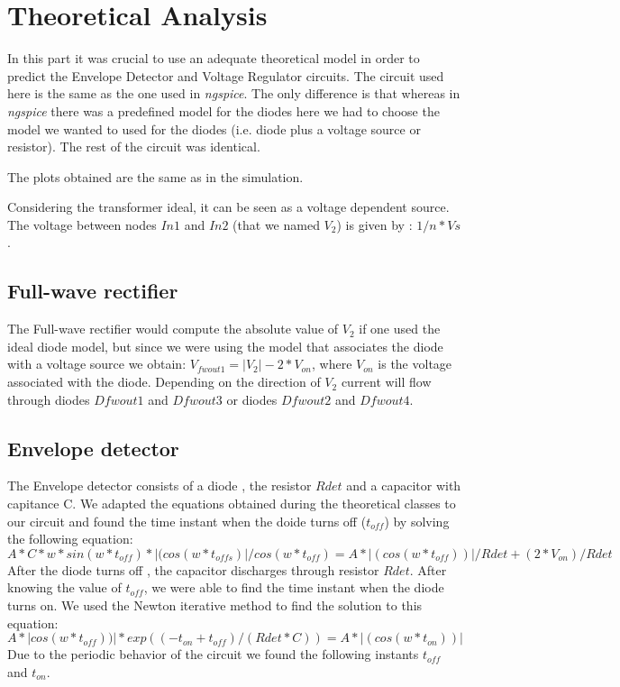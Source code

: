 \section{Theoretical Analysis}
\label{sec:analysis}



In this part it was crucial to use an adequate theoretical model in order to predict the Envelope Detector and Voltage Regulator circuits. The circuit used here is the same as the one used in \textit{ngspice}. The only difference is that whereas in \textit{ngspice} there was a predefined model for the diodes here we had to choose the model we wanted to used for the diodes (i.e. diode plus a voltage source or resistor). The rest of the circuit was identical.

The plots obtained are the same as in the simulation.

Considering the transformer ideal, it can be seen as a voltage dependent source. The voltage between nodes $In1$ and $In2$ (that we named $V_2$) is given by : $1/n * Vs$.

\subsection{Full-wave rectifier}
The Full-wave rectifier would  compute the  absolute value of $V_2$ if one used the ideal diode model, but since we were using the model that associates the diode with a voltage source we obtain: $V_{fwout1} = |V_2|- 2*V_{on}$, where $V_{on}$ is the voltage associated with the diode. Depending on the direction of $V_2$ current will flow through diodes $Dfwout1$ and $Dfwout3$ or diodes $Dfwout2$ and $Dfwout4$.

\subsection{Envelope detector}
The Envelope detector consists of a diode , the resistor $Rdet$ and a capacitor with capitance C. We adapted the equations obtained during the theoretical classes to our circuit and found the time instant when the doide turns off ($t_{off}$) by solving the following equation:
\begin{equation}
  A*C*w*sin(w*t_{off})*|(cos(w*t_{offs})|/cos(w*t_{off}) =  A*|(cos(w*t_{off}))|/Rdet +(2*V_{on})/Rdet
\end{equation}
After the diode turns off , the capacitor discharges through resistor $Rdet$.
After knowing the value of $t_{off}$, we were able to find the time instant when the diode turns on. We used the Newton iterative method to find the solution to this equation:
\begin{equation}
   A*|cos(w*t_{off}))|*exp((-t_{on}+t_{off})/(Rdet*C))=  A*|(cos(w*t_{on}))|
\end{equation}
Due to the periodic behavior of the circuit we found the following instants $t_{off}$ and $t_{on}$.  
